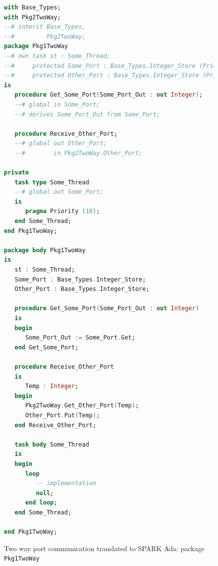 \begin{figure}[ht]
\singlespacing
\begin{lstlisting}[language=ada, frame=single, gobble=0]
with Base_Types;
with Pkg2TwoWay;
--# inherit Base_Types,
--#         Pkg2TwoWay;
package Pkg1TwoWay
--# own task st : Some_Thread;
--#     protected Some_Port : Base_Types.Integer_Store (Priority => 10);
--#     protected Other_Port : Base_Types.Integer_Store (Priority => 10);
is
   procedure Get_Some_Port(Some_Port_Out : out Integer);
   --# global in Some_Port;
   --# derives Some_Port_Out from Some_Port;
   
   procedure Receive_Other_Port;
   --# global out Other_Port;
   --#        in Pkg2TwoWay.Other_Port;
   
private   
   task type Some_Thread     
   --# global out Some_Port;   
   is
      pragma Priority (10);
   end Some_Thread;
end Pkg1TwoWay;

package body Pkg1TwoWay
is
   st : Some_Thread;
   Some_Port : Base_Types.Integer_Store;
   Other_Port : Base_Types.Integer_Store;
   
   procedure Get_Some_Port(Some_Port_Out : out Integer)
   is
   begin
      Some_Port_Out := Some_Port.Get;
   end Get_Some_Port;
   
   procedure Receive_Other_Port
   is
      Temp : Integer;
   begin
      Pkg2TwoWay.Get_Other_Port(Temp);
      Other_Port.Put(Temp);
   end Receive_Other_Port;
      
   task body Some_Thread
   is   
   begin      
      loop         
         -- implementation
         null;         
      end loop;      
   end Some_Thread;

end Pkg1TwoWay;
\end{lstlisting} 
\doublespacing
\caption{Two way port communication translated to SPARK Ada: package \lstinline{Pkg1TwoWay}}
\label{listing:port_communication_thread_two_way_spark_pkg1twoway}
\end{figure}

